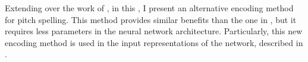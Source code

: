 
Extending over the work of \textcite{micchi2020not}, in this
\thesisdiss{}, I present an alternative encoding method for
pitch spelling. This method provides similar benefits than
the one in \textcite{micchi2020not}, but it requires less
parameters in the neural network architecture. Particularly,
this new encoding method is used in the input
representations of the network, described in
.
